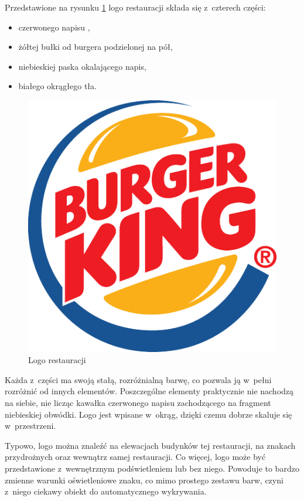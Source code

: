 Przedstawione na rysunku \ref{fig:bklogo} logo restauracji \bk składa się z~czterech części:
\begin{itemize}
    \item czerwonego napisu \bk,
    \item żółtej bułki od burgera podzielonej na pół,
    \item niebieskiej paska okalającego napis,
    \item białego okrągłego tła.
\end{itemize}

\begin{figure}[tb]
    \centering
    \includegraphics[width=0.4\columnwidth]{./figures/bklogo.pdf}
    \caption{Logo restauracji \bk~\cite{WikipediaEN:bklogo}}
    \label{fig:bklogo}
\end{figure}

Każda z~części ma swoją stałą, rozróżnialną barwę, co pozwala ją w~pełni rozróżnić od innych elementów. Poszczególne elementy praktycznie nie nachodzą na siebie, nie licząc kawałka czerwonego napisu zachodzącego na fragment niebieskiej obwódki. Logo jest wpisane w~okrąg, dzięki czemu dobrze skaluje się w~przestrzeni.

Typowo, logo \bk można znaleźć na elewacjach budynków tej restauracji, na znakach przydrożnych oraz wewnątrz samej restauracji. Co więcej, logo może być przedstawione z~wewnętrznym podświetleniem lub bez niego. Powoduje to bardzo zmienne warunki oświetleniowe znaku, co mimo prostego zestawu barw, czyni z~niego ciekawy obiekt do automatycznego wykrywania.
